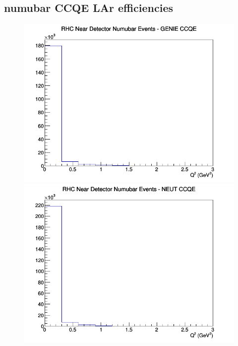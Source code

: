 \documentclass[12pt]{article}
\begin{document}
\subsection{numubar CCQE LAr efficiencies}
\begin{figure}[h]
\includegraphics[width=\linewidth]{eff_Q2/LAr/CCQE_RHC_ND_numubar_Q2_GENIE.png}
\endminipage
{}
\includegraphics[width=\linewidth]{eff_Q2/LAr/CCQE_RHC_ND_numubar_Q2_NEUT.png}
\endminipage
{}

\end{figure}
\end{document}
